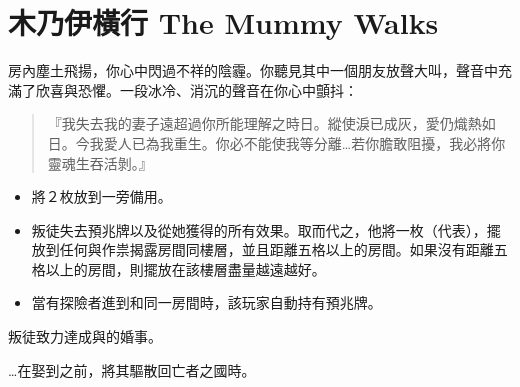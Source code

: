 
\chapter{木乃伊橫行 The Mummy Walks}

\begin{HauntStory}
  房內塵土飛揚，你心中閃過不祥的陰霾。你聽見其中一個朋友放聲大叫，聲音中充滿了欣喜與恐懼。一段冰冷、消沉的聲音在你心中顫抖：

  \begin{quote}
    『我失去我的妻子遠超過你所能理解之時日。縱使淚已成灰，愛仍熾熱如日。今我愛人已為我重生。你必不能使我等分離…若你膽敢阻擾，我必將你靈魂生吞活剝。』
  \end{quote}
\end{HauntStory}

\vspace*{-1em}
\begin{itemize}
  \item 將２枚放到一旁備用。
  \item 叛徒失去預兆牌以及從她獲得的所有效果。取而代之，他將一枚（代表），擺放到任何與作祟揭露房間同樓層，並且距離五格以上的房間。如果沒有距離五格以上的房間，則擺放在該樓層盡量越遠越好。
  \item 當有探險者進到和同一房間時，該玩家自動持有預兆牌。
\end{itemize}

叛徒致力達成與的婚事。

…在娶到之前，將其驅散回亡者之國時。

\vfill\null\pagebreak

